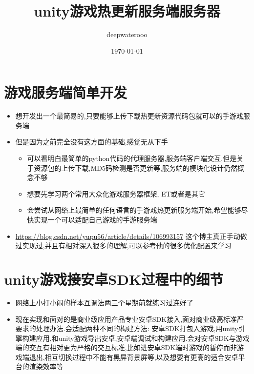 \documentclass[9pt, b5paper]{article}
\author{deepwaterooo}
\date{\today}
\title{unity游戏热更新服务端服务器}
\begin{document}
\maketitle
\tableofcontents


\section{游戏服务端简单开发}
\label{sec-1}
\begin{itemize}
\item 想开发出一个最简易的,只要能够上传下载热更新资源代码包就可以的手游戏服务端
\item 但是因为之前完全没有这方面的基础,感觉无从下手
\begin{itemize}
\item 可以看明白最简单的python代码的代理服务器,服务端客户端交互,但是关于资源包的上传下载,MD5码检测是否更新等,服务端的模块化设计仍然概念不够
\item 想要先学习两个常用大众化游戏服务器框架, ET或者是其它
\item 会尝试从网络上最简单的任何语言的手游戏热更新服务端开始,希望能够尽快实现一个可以适配自己游戏的手游服务端
\end{itemize}
\item \url{https://blog.csdn.net/yupu56/article/details/106993157} 这个博主真正手动做过实现过,并且有相对深入狠多的理解,可以参考他的很多优化配置来学习
\end{itemize}

\section{unity游戏接安卓SDK过程中的细节}
\label{sec-2}
\begin{itemize}
\item 网络上小打小闹的样本互调法两三个星期前就练习过连好了
\item 现在实现和面对的是商业级应用产品专业安卓SDK接入,面对商业级高标准严要求的处理办法.会适配两种不同的构建方法: 安卓SDK打包入游戏,用unity引擎构建应用,和unity游戏导出安卓,安卓端调试和构建应用.会对安卓SDK与游戏端的交互有相对更为严格的交互标准,比如进安卓SDK端时游戏的暂停而非游戏端退出,相互切换过程中不能有黑屏背景屏等,以及想要有更高的适合安卓平台的渲染效率等
\end{itemize}
\end{document}
